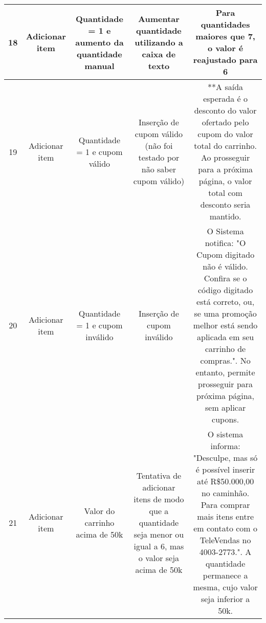 \begin{center}
\begin{tabular}{||c c c c c||}
\hline
18 & Adicionar item & Quantidade = 1 e aumento da quantidade manual & \multicolumn{1}{m{3cm}}{Aumentar quantidade utilizando a caixa de texto} & \multicolumn{1}{m{3cm}}{Para quantidades maiores que 7, o valor é reajustado para 6} \\
\hline
19 & Adicionar item & Quantidade = 1 e cupom válido & \multicolumn{1}{m{3cm}}{Inserção de cupom válido (não foi testado por não saber cupom válido)} & \multicolumn{1}{m{3cm}}{**A saída esperada é o desconto do valor ofertado pelo cupom do valor total do carrinho. Ao prosseguir para a próxima página, o valor total com desconto seria mantido.} \\
\hline
20 & Adicionar item & Quantidade = 1 e cupom inválido & \multicolumn{1}{m{3cm}}{Inserção de cupom inválido} & \multicolumn{1}{m{3cm}}{O Sistema notifica: "O Cupom digitado não é válido. Confira se o código digitado está correto, ou, se uma promoção melhor está sendo aplicada em seu carrinho de compras.". No entanto, permite prosseguir para próxima página, sem aplicar cupons.} \\
\hline
21 & Adicionar item & Valor do carrinho acima de 50k & \multicolumn{1}{m{3cm}}{Tentativa de adicionar itens de modo que a quantidade seja menor ou igual a 6, mas o valor seja acima de 50k} & \multicolumn{1}{m{3cm}}{O sistema informa: "Desculpe, mas só é possível inserir até R\$50.000,00 no caminhão. Para comprar mais itens entre em contato com o TeleVendas no 4003-2773.". A quantidade permanece a mesma, cujo valor seja inferior a 50k.} \\
\hline

\end{tabular}

\end{center}
